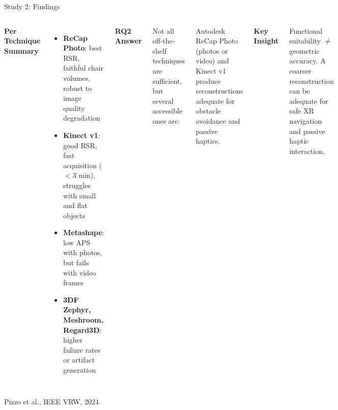 \documentclass[aspectratio=169, 12pt]{beamer}
\newcommand{\citefooter}[1]{\hfill{\tiny #1}}
\begin{document}
\begin{frame}{Study 2: Findings}
	\begin{columns}[t]
		\textbf{\textcolor{gbAqua}{Per Technique Summary}}
		\begin{itemize}
			\item \textbf{ReCap Photo}: best RSR, faithful chair volumes, robust to image quality degradation
			\item \textbf{Kinect v1}: good RSR, fast acquisition ($<$3 min), struggles with small and flat objects
			\item \textbf{Metashape}: low APS with photos, but fails with video frames
			\item \textbf{3DF Zephyr, Meshroom, Regard3D}: higher failure rates or artifact generation
		\end{itemize}

		\textbf{\textcolor{gbAqua}{RQ2 Answer}}

		\vspace{0.1cm}

		Not all off-the-shelf techniques are sufficient, but several accessible ones are:

		\vspace{0.15cm}

		\alert{Autodesk ReCap Photo} (photos or video) and \alert{Kinect v1} produce reconstructions adequate for obstacle avoidance and passive haptics.

		\vspace{0.25cm}

		\textbf{\textcolor{gbAqua}{Key Insight}}

		Functional suitability $\neq$ geometric accuracy. A coarser reconstruction can be adequate for safe XR navigation and passive haptic interaction.
	\end{columns}

	\citefooter{Pizzo et al., IEEE VRW, 2024}
\end{frame}



\end{document}
